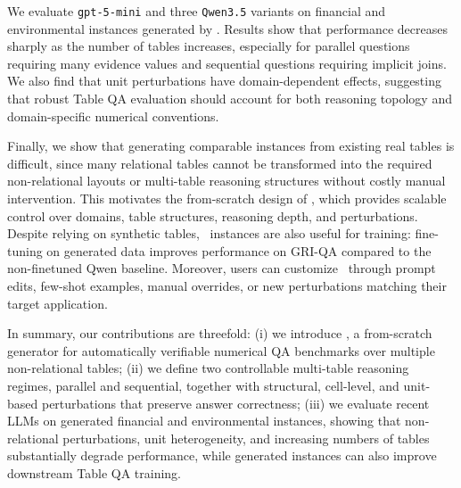 We evaluate \texttt{gpt-5-mini} and three \texttt{Qwen3.5} variants on financial and environmental instances generated by \name. Results show that performance decreases sharply as the number of tables increases, especially for parallel questions requiring many evidence values and sequential questions requiring implicit joins. We also find that unit perturbations have domain-dependent effects, suggesting that robust Table QA evaluation should account for both reasoning topology and domain-specific numerical conventions.

Finally, we show that generating comparable instances from existing real tables is difficult, since many relational tables cannot be transformed into the required non-relational layouts or multi-table reasoning structures without costly manual intervention. This motivates the from-scratch design of \name, which provides scalable control over domains, table structures, reasoning depth, and perturbations. Despite relying on synthetic tables, \name~instances are also useful for training: fine-tuning on generated data improves performance on GRI-QA \cite{1.16} compared to the non-finetuned Qwen baseline. Moreover, users can customize \name~through prompt edits, few-shot examples, manual overrides, or new perturbations matching their target application.

In summary, our contributions are threefold: (i) we introduce \name, a from-scratch generator for automatically verifiable numerical QA benchmarks over multiple non-relational tables; (ii) we define two controllable multi-table reasoning regimes, parallel and sequential, together with structural, cell-level, and unit-based perturbations that preserve answer correctness; (iii) we evaluate recent LLMs on generated financial and environmental instances, showing that non-relational perturbations, unit heterogeneity, and increasing numbers of tables substantially degrade performance, while generated instances can also improve downstream Table QA training.